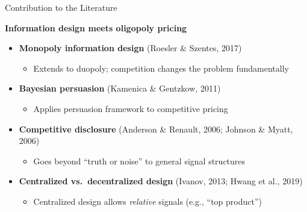 \documentclass[aspectratio=169, 11pt]{beamer}
\begin{document}
\begin{frame}{Contribution to the Literature}

\textbf{Information design meets oligopoly pricing}

\bigskip

\begin{itemize}
    \item \textbf{Monopoly information design} (Roesler \& Szentes, 2017)
    \begin{itemize}
        \item[$\rightarrow$] Extends to duopoly; competition changes the problem fundamentally
    \end{itemize}

    \medskip

    \item \textbf{Bayesian persuasion} (Kamenica \& Gentzkow, 2011)
    \begin{itemize}
        \item[$\rightarrow$] Applies persuasion framework to competitive pricing
    \end{itemize}

    \medskip

    \item \textbf{Competitive disclosure} (Anderson \& Renault, 2006; Johnson \& Myatt, 2006)
    \begin{itemize}
        \item[$\rightarrow$] Goes beyond ``truth or noise'' to general signal structures
    \end{itemize}

    \medskip

    \item \textbf{Centralized vs.\ decentralized design} (Ivanov, 2013; Hwang et al., 2019)
    \begin{itemize}
        \item[$\rightarrow$] Centralized design allows \emph{relative} signals (e.g., ``top product'')
    \end{itemize}
\end{itemize}

\end{frame}

\end{document}
